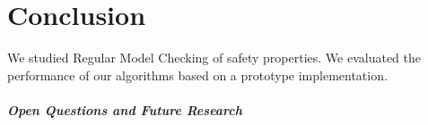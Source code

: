 \chapter{Conclusion}\label{chapter:conclusion}
We studied Regular Model Checking of safety properties. We evaluated the performance 
of our algorithms based on a prototype implementation. 
\paragraph*{Open Questions and Future Research}